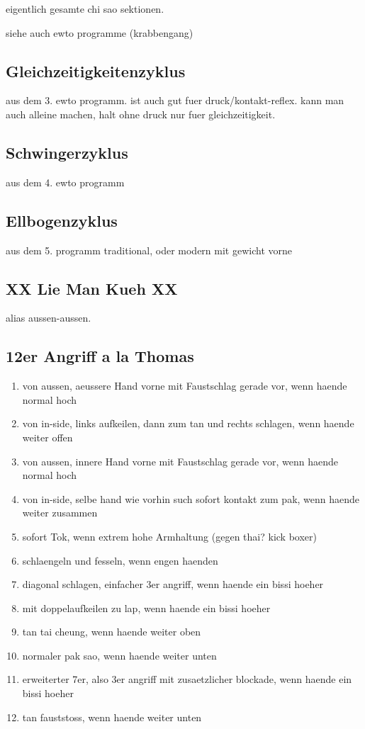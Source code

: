 eigentlich gesamte chi sao sektionen.

siehe auch ewto programme (krabbengang)


\subsection{Gleichzeitigkeitenzyklus}

aus dem 3. ewto programm.
ist auch gut fuer druck/kontakt-reflex.
kann man auch alleine machen, halt ohne druck nur fuer gleichzeitigkeit.

\subsection{Schwingerzyklus}

aus dem 4. ewto programm

\subsection{Ellbogenzyklus}

aus dem 5. programm
traditional, oder modern mit gewicht vorne


\subsection{XX Lie Man Kueh XX}

alias aussen-aussen.

\subsection{12er Angriff a la Thomas}

\begin{enumerate}
	\item von aussen, aeussere Hand vorne mit Faustschlag gerade vor, wenn haende normal hoch
	\item von in-side, links aufkeilen, dann zum tan und rechts schlagen, wenn haende weiter offen
	\item von aussen, innere Hand vorne mit Faustschlag gerade vor, wenn haende normal hoch
	\item von in-side, selbe hand wie vorhin such sofort kontakt zum pak, wenn haende weiter zusammen
	\item sofort Tok, wenn extrem hohe Armhaltung (gegen thai? kick boxer)
	\item schlaengeln und fesseln, wenn engen haenden
	\item diagonal schlagen, einfacher 3er angriff, wenn haende ein bissi hoeher
	\item mit doppelaufkeilen zu lap, wenn haende ein bissi hoeher
	\item tan tai cheung, wenn haende weiter oben
	\item normaler pak sao, wenn haende weiter unten
	\item erweiterter 7er, also 3er angriff mit zusaetzlicher blockade, wenn haende ein bissi hoeher
	\item tan fauststoss, wenn haende weiter unten
\end{enumerate}

